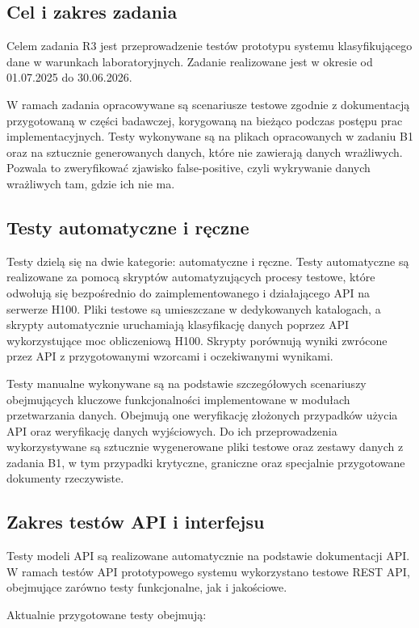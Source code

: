 \documentclass[12pt,a4paper]{report}
\begin{document}
\subsection{Cel i zakres zadania}
Celem zadania R3 jest przeprowadzenie testów prototypu systemu klasyfikującego dane w warunkach laboratoryjnych. Zadanie realizowane jest w okresie od 01.07.2025 do 30.06.2026.

W ramach zadania opracowywane są scenariusze testowe zgodnie z dokumentacją przygotowaną w części badawczej, korygowaną na bieżąco podczas postępu prac implementacyjnych. Testy wykonywane są na plikach opracowanych w zadaniu B1 oraz na sztucznie generowanych danych, które nie zawierają danych wrażliwych. Pozwala to zweryfikować zjawisko false-positive, czyli wykrywanie danych wrażliwych tam, gdzie ich nie ma.

\subsection{Testy automatyczne i ręczne}
Testy dzielą się na dwie kategorie: automatyczne i ręczne. Testy automatyczne są realizowane za pomocą skryptów automatyzujących procesy testowe, które odwołują się bezpośrednio do zaimplementowanego i działającego API na serwerze H100. Pliki testowe są umieszczane w dedykowanych katalogach, a skrypty automatycznie uruchamiają klasyfikację danych poprzez API wykorzystujące moc obliczeniową H100. Skrypty porównują wyniki zwrócone przez API z przygotowanymi wzorcami i oczekiwanymi wynikami.

Testy manualne wykonywane są na podstawie szczegółowych scenariuszy obejmujących kluczowe funkcjonalności implementowane w modułach przetwarzania danych. Obejmują one weryfikację złożonych przypadków użycia API oraz weryfikację danych wyjściowych. Do ich przeprowadzenia wykorzystywane są sztucznie wygenerowane pliki testowe oraz zestawy danych z zadania B1, w tym przypadki krytyczne, graniczne oraz specjalnie przygotowane dokumenty rzeczywiste.

\subsection{Zakres testów API i interfejsu}
Testy modeli API są realizowane automatycznie na podstawie dokumentacji API. W ramach testów API prototypowego systemu wykorzystano testowe REST API, obejmujące zarówno testy funkcjonalne, jak i jakościowe.

Aktualnie przygotowane testy obejmują:
\end{document}
